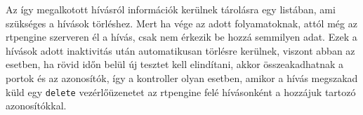 Az így megalkotott hívásról információk kerülnek tárolásra egy listában, ami szükséges
a hívások törléshez. Mert ha vége az adott folyamatoknak, attól még az rtpengine szerveren
él a hívás, csak nem érkezik be hozzá semmilyen adat. Ezek a hívások adott inaktivitás után automatikusan törlésre kerülnek, viszont abban az esetben, ha rövid időn 
belül új tesztet kell elindítani, akkor összeakadhatnak a portok és az azonosítók, így a 
kontroller olyan esetben, amikor a hívás megszakad küld egy \texttt{delete} 
vezérlőüzenetet az rtpengine felé hívásonként a hozzájuk tartozó azonosítókkal.
